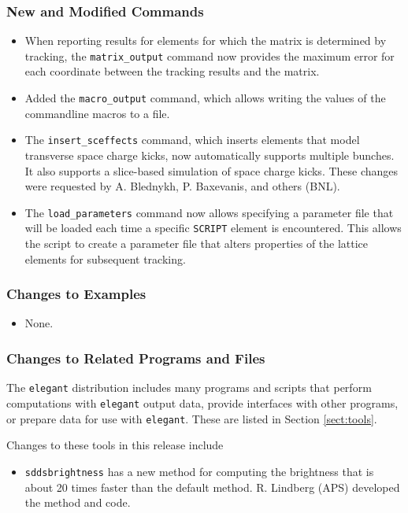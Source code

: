 \documentclass[11pt]{article}
\begin{document}
\subsubsection{New and Modified Commands}
\begin{itemize}
\item When reporting results for elements for which the matrix is determined by tracking, the
  \verb|matrix_output| command now provides the maximum error for each coordinate between the tracking
  results and the matrix.
\item Added the \verb|macro_output| command, which allows writing the values of the commandline macros to
  a file.
\item The \verb|insert_sceffects| command, which inserts elements that model transverse space charge kicks,
  now automatically supports multiple bunches. It also supports a slice-based simulation of space charge
  kicks. These changes were requested by A. Blednykh, P. Baxevanis, and others (BNL).
\item The \verb|load_parameters| command now allows specifying a parameter file that will be loaded each
  time a specific \verb|SCRIPT| element is encountered. This allows the script to create
  a parameter file that alters properties of the lattice elements for subsequent tracking.
\end{itemize}

\subsubsection{Changes to Examples}

\begin{itemize}
\item None.
\end{itemize}

\subsubsection{Changes to Related Programs and Files}

The {\tt elegant} distribution includes many programs and scripts that perform computations with {\tt elegant}
output data, provide interfaces with other programs, or prepare data for use with {\tt elegant}. These
are listed in Section \ref{sect:tools}. 

Changes to these tools in this release include
\begin{itemize}
\item \verb|sddsbrightness| has a new method for computing the brightness that is about 20 times faster than the
  default method. R. Lindberg (APS) developed the method and code.
\end{itemize}
\end{document}
